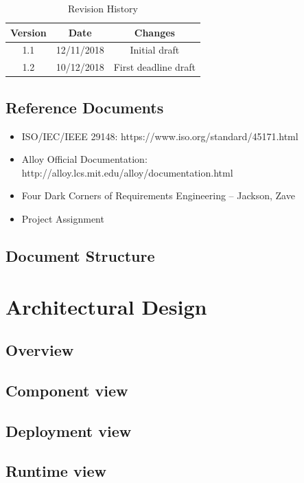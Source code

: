 \documentclass[titlepage]{article}
\begin{document}
\begin{table}[ht]
	\centering
	\begin{tabular}{ccc} 
		Version & Date & Changes  \\ 
		\hline
		1.1 & 12/11/2018 & Initial draft \\
		1.2 & 10/12/2018 & First deadline draft \\
	\end{tabular}
	\caption{Revision History}
	\label{default}
\end{table}
	
	
\subsection{Reference Documents}

\begin{itemize}
   	\item ISO/IEC/IEEE 29148: https://www.iso.org/standard/45171.html
	\item Alloy Official Documentation: http://alloy.lcs.mit.edu/alloy/documentation.html
   	\item Four Dark Corners of Requirements Engineering – Jackson, Zave
	\item Project Assignment
\end{itemize}


\subsection{Document Structure}
\pagebreak



\section{Architectural Design}
\subsection{Overview}
\subsection{Component view}
\subsection{Deployment view}
\subsection{Runtime view}
\end{document}
